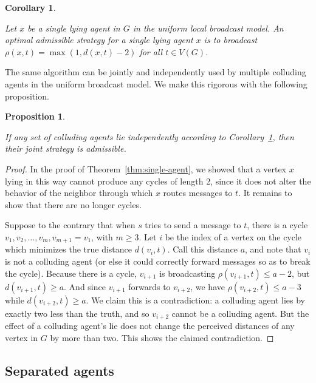 \documentclass[reprint]{revtex4-1}
\newtheorem{proposition}{Proposition}[section]
\newtheorem{corollary}{Corollary}[section]
\begin{document}
\begin{corollary} \label{cor:single-agent}

Let $x$ be a single lying agent in $G$ in the uniform local broadcast model. An
optimal admissible strategy for a single lying agent $x$ is to broadcast
$\rho(x,t) = \max(1, d(x,t) - 2)$ for all $t \in V(G)$.

\end{corollary}

The same algorithm can be jointly and independently used by multiple colluding
agents in the uniform broadcast model. We make this rigorous with the following
proposition.

\begin{proposition} \label{prop:independent-agents}

If any set of colluding agents lie independently according to
Corollary~\ref{cor:single-agent}, then their joint strategy is admissible.

\end{proposition}

\begin{proof}

In the proof of Theorem~\ref{thm:single-agent}, we showed that a vertex $x$
lying in this way cannot produce any cycles of length 2, since it does not
alter the behavior of the neighbor through which $x$ routes messages to $t$. It
remains to show that there are no longer cycles.

Suppose to the contrary that when $s$ tries to send a message to $t$, there is
a cycle $v_1, v_2, \dots, v_m, v_{m+1} = v_1$, with $m \geq 3$. Let $i$ be the
index of a vertex on the cycle which minimizes the true distance $d(v_i, t)$.
Call this distance $a$, and note that $v_i$ is not a colluding agent (or else
it could correctly forward messages so as to break the cycle). Because there is
a cycle, $v_{i+1}$ is broadcasting $\rho(v_{i+1}, t) \leq a-2$, but $d(v_{i+1},
t) \geq a$. And since $v_{i+1}$ forwards to $v_{i+2}$, we have $\rho(v_{i+2},
t) \leq a-3$ while $d(v_{i+2}, t) \geq a$. We claim this is a contradiction: a
colluding agent lies by exactly two less than the truth, and so $v_{i+2}$
cannot be a colluding agent. But the effect of a colluding agent's lie does not
change the perceived distances of any vertex in $G$ by more than two. This
shows the claimed contradiction.
\end{proof}

\subsection{Separated agents}\label{sec:separated}
\end{document}
